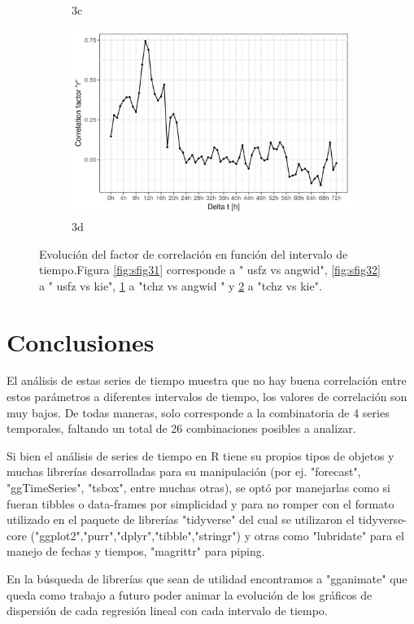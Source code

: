 \documentclass[12pt,a4paper,spanish]{article}
\begin{document}
\begin{figure}[h!]
\begin{subfigure}{.5\textwidth}
    \caption{3c}
    \label{fig:sfig33}
    \end{subfigure}%
    \begin{subfigure}{.5\textwidth}
    \centering
    \includegraphics[width=.8\linewidth,scale=0.8]{tchzkie_corfac.png}
    \caption{3d}
    \label{fig:sfig34}
    \end{subfigure}
    \caption{Evolución del factor de correlación en función del intervalo de tiempo.Figura \ref{fig:sfig31} corresponde a " usfz vs angwid", \ref{fig:sfig32} a " usfz vs kie", \ref{fig:sfig33} a "tchz vs angwid " y \ref{fig:sfig34} a "tchz vs kie". }
    \label{fig:figura3}
\end{figure}

\newpage
\section{Conclusiones}
El análisis de estas series de tiempo muestra que no hay buena correlación entre estos parámetros a diferentes intervalos de tiempo, los valores de correlación son muy bajos. De todas maneras, solo corresponde a la combinatoria de 4 series temporales, faltando un total de 26 combinaciones posibles a analizar. \par
Si bien el análisis de series de tiempo en R tiene su propios tipos de objetos y muchas librerías desarrolladas para su manipulación (por ej. "forecast", "ggTimeSeries", "tsbox", entre muchas otras), se optó por manejarlas como si fueran tibbles o data-frames por simplicidad y para no romper con el formato utilizado en el paquete de librerías "tidyverse" del cual se utilizaron el tidyverse-core ("ggplot2","purr","dplyr","tibble","stringr") y otras como "lubridate" para el manejo de fechas y tiempos, "magrittr" para piping.\par
En la búsqueda de librerías que sean de utilidad encontramos a "gganimate" que queda como trabajo a futuro poder animar la evolución de los gráficos de dispersión de cada regresión lineal con cada intervalo de tiempo.
\end{document}
